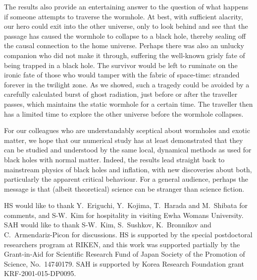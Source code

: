 \documentclass[aps,showpacs,twocolumn,draft,eqsecnum]{revtex4}
\begin{document}
The results also provide an entertaining answer to the question of what happens
if someone attempts to traverse the wormhole. At best, with sufficient
alacrity, our hero could exit into the other universe, only to look behind and
see that the passage has caused the wormhole to collapse to a black hole,
thereby sealing off the causal connection to the home universe. Perhaps there
was also an unlucky companion who did not make it through, suffering the
well-known grisly fate of being trapped in a black hole. The survivor would be
left to ruminate on the ironic fate of those who would tamper with the fabric
of space-time: stranded forever in the twilight zone. As we showed, such a
tragedy could be avoided by a carefully calculated burst of ghost radiation,
just before or after the traveller passes, which maintains the static wormhole
for a certain time. The traveller then has a limited time to explore the other
universe before the wormhole collapses.

For our colleagues who are understandably sceptical about wormholes and exotic
matter, we hope that our numerical study has at least demonstrated that they
can be studied and understood by the same local, dynamical methods as used for
black holes with normal matter. Indeed, the results lead straight back to
mainstream physics of black holes and inflation, with new discoveries about
both, particularly the apparent critical behaviour. For a general audience,
perhaps the message is that (albeit theoretical) science can be stranger than
science fiction.

\begin{acknowledgments}
HS would like to thank Y.~Eriguchi, Y.~Kojima, T.~Harada and M.~Shibata for
comments, and S-W.~Kim for hospitality in visiting Ewha Womans University. SAH
would like to thank S-W.~Kim, S.~Sushkov, K.~Bronnikov and C.~Armendariz-Picon
for discussions. HS is supported by the special postdoctoral researchers
program at RIKEN, and this work was supported partially by the Grant-in-Aid for
Scientific Research Fund of Japan Society of the Promotion of Science,
No.~14740179. SAH is supported by Korea Research Foundation grant
KRF-2001-015-DP0095.
\end{acknowledgments}
\end{document}
